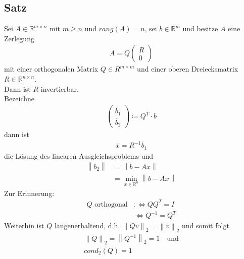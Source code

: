 \documentclass[ngerman,fontsize=11pt, paper=a4, parskip=half, titlepage=true, toc=bib]{scrbook}
\newcommand{\R}{\mathds{R}}
\newcommand{\Ren}{\mathds{R}^{n}}
\newcommand{\nn}[1]{\left\| #1 \right\|}
\begin{document}
	 
	 \subsection{Satz}
	 Sei $A\in \R^{m\times n} $ mit $m\geq n$ und $rang(A) = n$,
	 sei $b\in\R^m$ und besitze $A$ eine Zerlegung
	 \begin{gather*}
	 	A= Q\begin{pmatrix}R\\0\end{pmatrix}
	 \end{gather*}
	 mit einer orthogonalen Matrix $Q\in R^{m\times m}$ und 
	 einer oberen Dreiecksmatrix $R\in \R^{n\times n}$. \\
	 Dann ist $R$ invertierbar. \\
	 Bezeichne 
	 \begin{gather}
	 	\begin{pmatrix} \overline{b}_1 \\ \overline{b}_2\end{pmatrix}
	 	\coloneqq Q^T\cdot b
	 	\label{IV.3.9}
	 \end{gather}
	 dann ist
	 \begin{gather}
	 	\overline{x} = R^{-1} \overline{b}_1 
	 	\label{IV.3.10}
	 \end{gather}
	 die Lösung des linearen Ausgleichsproblems und
	 \begin{align*}
	 	\nn{\overline{b}_2} &= \nn{b-A\overline{x}} \\
	 									& = \min_{x\in \Ren }\nn{b-Ax}
	 \end{align*}
	 Zur Erinnerung:
	 \begin{align*}
	 	Q \text{ orthogonal} &:\Leftrightarrow QQ^T = I \\
	 									&\, \Leftrightarrow Q^{-1} = Q^T
	 \end{align*}
	 Weiterhin ist $Q$ längenerhaltend, d.h. $\nn{Qv}_2 = \nn{v}_2$ 
	 und somit folgt
	 \begin{gather}
	 \nonumber
	 	\nn{Q}_2 = \nn{Q^{-1}}_2 = 1 \quad \text{und} \\
	 	cond_2(Q) = 1
	 	\label{IV.3.11}
	 \end{gather}
	 
\end{document}
